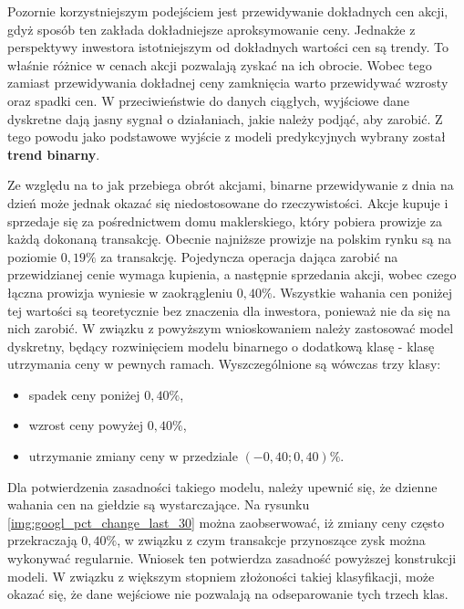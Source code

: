 \documentclass[a4paper, twoside, 11pt, openright]{article}
\begin{document}
Pozornie korzystniejszym podejściem jest przewidywanie dokładnych cen akcji, gdyż sposób ten zakłada dokładniejsze aproksymowanie ceny. Jednakże z perspektywy inwestora istotniejszym od dokładnych wartości cen są trendy. To właśnie różnice w cenach akcji pozwalają zyskać na ich obrocie. Wobec tego zamiast przewidywania dokładnej ceny zamknięcia warto przewidywać wzrosty oraz spadki cen. W przeciwieństwie do danych ciągłych, wyjściowe dane dyskretne  dają jasny sygnał o działaniach, jakie należy podjąć, aby zarobić. Z tego powodu jako podstawowe wyjście z modeli predykcyjnych wybrany został \textbf{trend binarny}.

\bigskip

Ze względu na to jak przebiega obrót akcjami, binarne przewidywanie z dnia na dzień może jednak okazać się niedostosowane do rzeczywistości. Akcje kupuje i sprzedaje się za pośrednictwem domu maklerskiego, który pobiera prowizje za każdą dokonaną transakcję. Obecnie najniższe prowizje na polskim rynku są na poziomie $0,19\%$ za transakcję. Pojedyncza operacja dająca zarobić na przewidzianej cenie wymaga kupienia, a następnie sprzedania akcji, wobec czego łączna prowizja wyniesie w zaokrągleniu $0,40\%$. Wszystkie wahania cen poniżej tej wartości są teoretycznie bez znaczenia dla inwestora, ponieważ nie da się na nich zarobić. W związku z powyższym wnioskowaniem należy zastosować model dyskretny, będący rozwinięciem modelu binarnego o dodatkową klasę - klasę utrzymania ceny w pewnych ramach. Wyszczególnione są wówczas trzy klasy:
\begin{itemize}
\item spadek ceny poniżej $0,40\%$,
\item wzrost ceny powyżej $0,40\%$,
\item utrzymanie zmiany ceny w przedziale $(-0,40; 0,40)\%$.
\end{itemize}

Dla potwierdzenia zasadności takiego modelu, należy upewnić się, że dzienne wahania cen na giełdzie są wystarczające. Na rysunku \ref{img:googl_pct_change_last_30} można zaobserwować, iż zmiany ceny często przekraczają $0,40\%$, w związku z czym transakcje przynoszące zysk można wykonywać regularnie. Wniosek ten potwierdza zasadność powyższej konstrukcji modeli. W związku z większym stopniem złożoności takiej klasyfikacji, może okazać się, że dane wejściowe nie pozwalają na odseparowanie tych trzech klas. 
\end{document}
